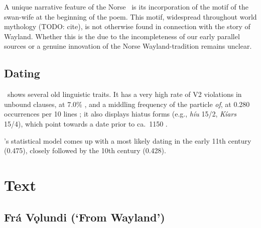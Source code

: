 A unique narrative feature of the Norse \Volundarkvida\ is its incorporation of the motif of the swan-wife at the beginning of the poem.  This motif, widespread throughout world mythology (TODO: cite), is not otherwise found in connection with the story of Wayland.  Whether this is the due to the incompleteness of our early parallel sources or a genuine innovation of the Norse Wayland-tradition remains unclear.

\subsection{Dating}

\Volundarkvida\ shows several old linguistic traits.  It has a very high rate of V2 violations in unbound clauses, at 7.0\% \parencite[250--251, 255]{Haukur2012}, and a middling frequency of the particle \emph{of}, at 0.280 occurrences per 10 lines \parencite[70]{Sapp2022}; it also displays hiatus forms (e.g., \emph{híu} 15/2, \emph{Kíars} 15/4), which point towards a date prior to ca.~1150 \ce.

\textcite[185]{Sapp2022}’s statistical model comes up with a most likely dating in the early 11th century (0.475), closely followed by the 10th century (0.428).

\clearpage

\section{Text}

\subsection{Frá Vǫlundi (‘From Wayland’)}

